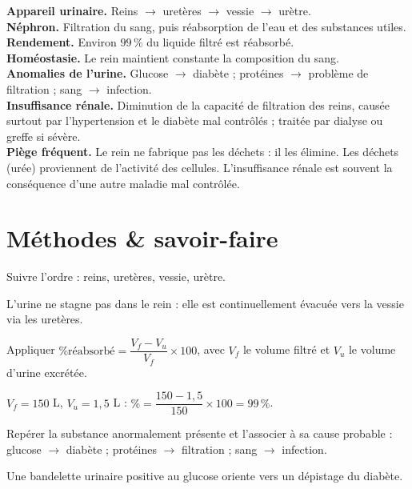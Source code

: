 \begin{synthese}
\textbf{Appareil urinaire.} Reins $\to$ uretères $\to$ vessie $\to$ urètre.\\[4pt]
\textbf{Néphron.} Filtration du sang, puis réabsorption de l'eau et des substances
utiles.\\[4pt]
\textbf{Rendement.} Environ $99\,\%$ du liquide filtré est réabsorbé.\\[4pt]
\textbf{Homéostasie.} Le rein maintient constante la composition du sang.\\[4pt]
\textbf{Anomalies de l'urine.} Glucose $\to$ diabète ; protéines $\to$ problème de
filtration ; sang $\to$ infection.\\[4pt]
\textbf{Insuffisance rénale.} Diminution de la capacité de filtration des reins,
causée surtout par l'hypertension et le diabète mal contrôlés ; traitée par dialyse
ou greffe si sévère.\\[4pt]
\textbf{Piège fréquent.} Le rein ne fabrique pas les déchets : il les élimine. Les
déchets (urée) proviennent de l'activité des cellules. L'insuffisance rénale est
souvent la conséquence d'une autre maladie mal contrôlée.
\end{synthese}

\section{Méthodes \& savoir-faire}

Suivre l'ordre : reins, uretères, vessie, urètre.
\begin{exemple}
L'urine ne stagne pas dans le rein : elle est continuellement évacuée vers la vessie via
les uretères.
\end{exemple}

Appliquer $\%\text{réabsorbé}=\dfrac{V_f-V_u}{V_f}\times100$, avec $V_f$ le volume
filtré et $V_u$ le volume d'urine excrétée.
\begin{exemple}
$V_f=150$ L, $V_u=1{,}5$ L : $\%=\dfrac{150-1{,}5}{150}\times100=99\,\%$.
\end{exemple}

Repérer la substance anormalement présente et l'associer à sa cause probable : glucose
$\to$ diabète ; protéines $\to$ filtration ; sang $\to$ infection.
\begin{exemple}
Une bandelette urinaire positive au glucose oriente vers un dépistage du diabète.
\end{exemple}

